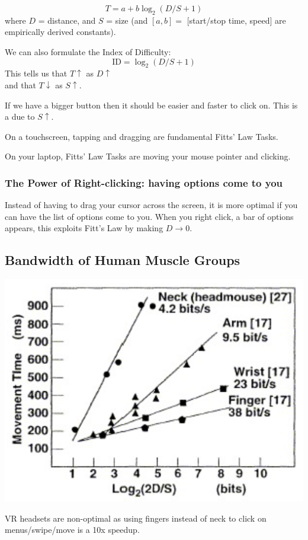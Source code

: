 \begin{equation}
    T = a + b\log_2(D/S+1)
\end{equation}
where $D$ = distance, and $S$ = size (and $[a, b] = $ [start/stop time, speed] are empirically derived constants).

We can also formulate the Index of Difficulty:
\begin{equation}
    \text{ID} = \log_2(D/S + 1)
\end{equation}
This tells us that $T\uparrow$ as $D\uparrow$ \\
and that $T\downarrow$ as $S\uparrow$.

\begin{shaded}
    If we have a bigger button then it should be easier and faster to click on. This is a due to $S\uparrow$.
\end{shaded}

On a touchscreen, tapping and dragging are fundamental Fitts' Law Tasks.

On your laptop, Fitts' Law Tasks are moving your mouse pointer and clicking.

\subsubsection{The Power of Right-clicking: having options come to you}
Instead of having to drag your cursor across the screen, it is more optimal if you can have the list of options come to you. When you right click, a bar of options appears, this exploits Fitt's Law by making $D\to0$.


\subsection{Bandwidth of Human Muscle Groups}
\begin{center}
    \includegraphics[scale=0.23]{lectures/wk4/img/bandwidth.png}
\end{center}
VR headsets are non-optimal as using fingers instead of neck to click on menus/swipe/move is a \>10x speedup.
